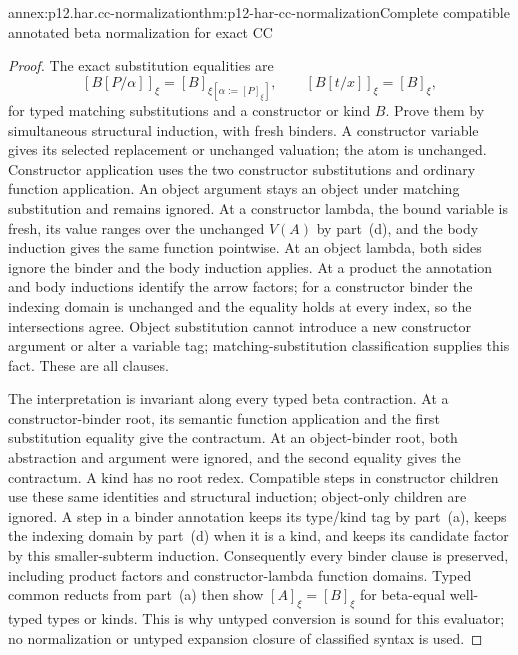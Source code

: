 \begin{annexitem}{annex:p12.har.cc-normalization}{thm:p12-har-cc-normalization}{Complete compatible annotated beta normalization for exact CC}
\begin{proof}
The exact substitution equalities are
\[
 [B[P/\alpha]]_\xi=[B]_{\xi[\alpha:=[P]_\xi]},\qquad
 [B[t/x]]_\xi=[B]_\xi,
\]
for typed matching substitutions and a constructor or kind \(B\).
Prove them by simultaneous structural induction, with fresh binders.
A constructor variable gives its selected replacement or unchanged
valuation; the atom is unchanged. Constructor application uses the two
constructor substitutions and ordinary function application. An object
argument stays an object under matching substitution and remains ignored.
At a constructor lambda, the bound variable is fresh, its value ranges
over the unchanged \(V(A)\) by part~(d), and the body induction gives the
same function pointwise. At an object lambda, both sides ignore the
binder and the body induction applies. At a product the annotation and
body inductions identify the arrow factors; for a constructor binder the
indexing domain is unchanged and the equality holds at every index, so
the intersections agree. Object substitution cannot introduce a new
constructor argument or alter a variable tag; matching-substitution
classification supplies this fact. These are all clauses.

The interpretation is invariant along every typed beta contraction.
At a constructor-binder root, its semantic function application and the
first substitution equality give the contractum. At an object-binder
root, both abstraction and argument were ignored, and the second equality
gives the contractum. A kind has no root redex. Compatible steps in
constructor children use these same identities and structural induction;
object-only children are ignored. A step in a binder annotation keeps
its type/kind tag by part~(a), keeps the indexing domain by part~(d) when it is a
kind, and keeps its candidate factor by this smaller-subterm induction.
Consequently every binder clause is preserved, including product factors
and constructor-lambda function domains. Typed common reducts from part~(a)
then show \([A]_\xi=[B]_\xi\) for beta-equal well-typed types or
kinds. This is why untyped conversion is sound for this evaluator; no
normalization or untyped expansion closure of classified syntax is used.


\end{proof}
\end{annexitem}
